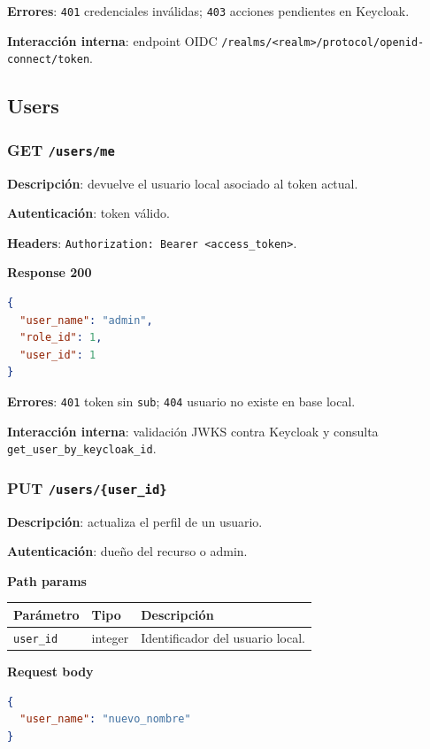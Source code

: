 \documentclass[12pt,letterpaper]{article}
\def\codefile#1{\nolinkurl{#1}}
\def\methodget{\textbf{\color{blue!60!black}GET}}
\def\methodput{\textbf{\color{orange!80!black}PUT}}
\begin{document}
\textbf{Errores}: \codefile{401} credenciales inválidas; \codefile{403} acciones pendientes en Keycloak.

\textbf{Interacción interna}: endpoint OIDC \codefile{/realms/<realm>/protocol/openid-connect/token}.

\subsection{Users}

\subsubsection{\methodget{} \codefile{/users/me}}

\textbf{Descripción}: devuelve el usuario local asociado al token actual.

\textbf{Autenticación}: token válido.

\textbf{Headers}: \codefile{Authorization: Bearer <access\_token>}.

\textbf{Response 200}
\begin{lstlisting}[language=json]
{
  "user_name": "admin",
  "role_id": 1,
  "user_id": 1
}
\end{lstlisting}

\textbf{Errores}: \codefile{401} token sin \codefile{sub}; \codefile{404} usuario no existe en base local.

\textbf{Interacción interna}: validación JWKS contra Keycloak y consulta \codefile{get\_user\_by\_keycloak\_id}.

\subsubsection{\methodput{} \codefile{/users/{user_id}}}

\textbf{Descripción}: actualiza el perfil de un usuario.

\textbf{Autenticación}: dueño del recurso o admin.

\textbf{Path params}
\begin{longtable}{p{}p{}p{}}
\toprule
\textbf{Parámetro} & \textbf{Tipo} & \textbf{Descripción}\\
\midrule
\codefile{user\_id} & integer & Identificador del usuario local.\\
\bottomrule
\end{longtable}

\textbf{Request body}
\begin{lstlisting}[language=json]
{
  "user_name": "nuevo_nombre"
}
\end{lstlisting}
\end{document}
